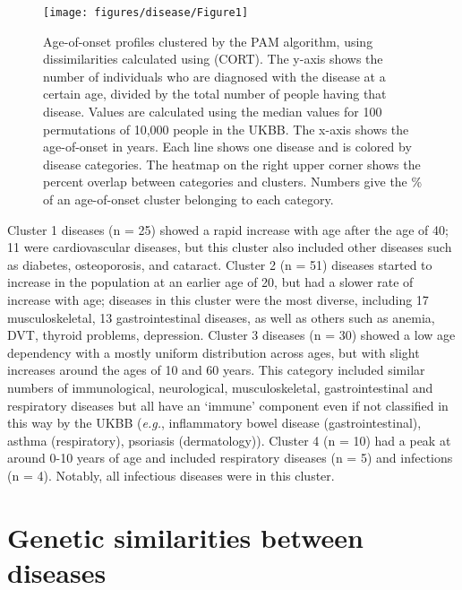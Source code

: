 \documentclass[12pt,twoside]{unicam}
\begin{document}
\begin{figure}

{\centering \texttt{[image: figures/disease/Figure1]} 

}

\caption[Age-of-onset clusters.]{Age-of-onset profiles clustered by the PAM algorithm, using dissimilarities calculated using (CORT). The y-axis shows the number of individuals who are diagnosed with the disease at a certain age, divided by the total number of people having that disease. Values are calculated using the median values for 100 permutations of 10,000 people in the UKBB. The x-axis shows the age-of-onset in years. Each line shows one disease and is colored by disease categories. The heatmap on the right upper corner shows the percent overlap between categories and clusters. Numbers give the \% of an age-of-onset cluster belonging to each category.}\label{fig:disFig1}
\end{figure}

Cluster 1 diseases (n = 25) showed a rapid increase with age after the age of 40; 11 were cardiovascular diseases, but this cluster also included other diseases such as diabetes, osteoporosis, and cataract. Cluster 2 (n = 51) diseases started to increase in the population at an earlier age of 20, but had a slower rate of increase with age; diseases in this cluster were the most diverse, including 17 musculoskeletal, 13 gastrointestinal diseases, as well as others such as anemia, DVT, thyroid problems, depression. Cluster 3 diseases (n = 30) showed a low age dependency with a mostly uniform distribution across ages, but with slight increases around the ages of 10 and 60 years. This category included similar numbers of immunological, neurological, musculoskeletal, gastrointestinal and respiratory diseases but all have an `immune' component even if not classified in this way by the UKBB (\emph{e.g.}, inflammatory bowel disease (gastrointestinal), asthma (respiratory), psoriasis (dermatology)). Cluster 4 (n = 10) had a peak at around 0-10 years of age and included respiratory diseases (n = 5) and infections (n = 4). Notably, all infectious diseases were in this cluster.

\hypertarget{genetic-similarities-between-diseases}{%
\section{Genetic similarities between diseases}\label{genetic-similarities-between-diseases}}
\end{document}
